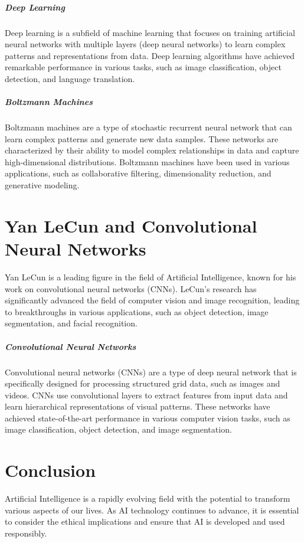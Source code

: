 \documentclass{article}
\begin{document}
\subparagraph{Deep Learning}
Deep learning is a subfield of machine learning that focuses on training artificial neural networks with multiple layers (deep neural networks) to learn complex patterns and representations from data. Deep learning algorithms have achieved remarkable performance in various tasks, such as image classification, object detection, and language translation.

\subparagraph{Boltzmann Machines}
Boltzmann machines are a type of stochastic recurrent neural network that can learn complex patterns and generate new data samples. These networks are characterized by their ability to model complex relationships in data and capture high-dimensional distributions. Boltzmann machines have been used in various applications, such as collaborative filtering, dimensionality reduction, and generative modeling.

\section{Yan LeCun and Convolutional Neural Networks}
Yan LeCun is a leading figure in the field of Artificial Intelligence, known for his work on convolutional neural networks (CNNs). LeCun's research has significantly advanced the field of computer vision and image recognition, leading to breakthroughs in various applications, such as object detection, image segmentation, and facial recognition.

\subparagraph{Convolutional Neural Networks}
Convolutional neural networks (CNNs) are a type of deep neural network that is specifically designed for processing structured grid data, such as images and videos. CNNs use convolutional layers to extract features from input data and learn hierarchical representations of visual patterns. These networks have achieved state-of-the-art performance in various computer vision tasks, such as image classification, object detection, and image segmentation.

\section{}
\section{Conclusion}
Artificial Intelligence is a rapidly evolving field with the potential to transform various aspects of our lives. As AI technology continues to advance, it is essential to consider the ethical implications and ensure that AI is developed and used responsibly.
\end{document}
